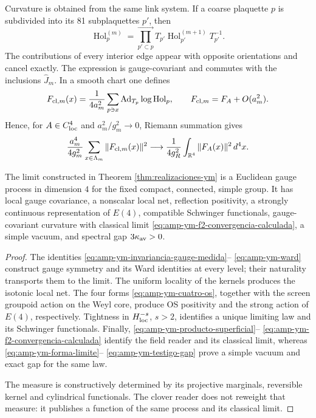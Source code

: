 Curvature is obtained from the same link system. If a coarse
plaquette \(p\) is subdivided into its 81 subplaquettes \(p'\), then
\begin{equation}\label{eq:amp-ym-producto-superficial}
 \operatorname{Hol}^{(m)}_{p}
 =\prod_{p'\subset p}^{\longrightarrow}
 T_{p'}\operatorname{Hol}^{(m+1)}_{p'}T_{p'}^{-1}.
\end{equation}
The contributions of every interior edge appear with opposite
orientations and cancel exactly.  The expression is gauge-covariant and
commutes with the inclusions \(\widehat J_m\).  In a smooth chart one defines
\begin{equation}\label{eq:amp-ym-clover-definido}
 F_{{\rm cl},m}(x)
 =\frac1{4a_m^2}\sum_{p\ni x}
 \operatorname{Ad}_{T_p}\log\operatorname{Hol}_{p},
 \qquad
 F_{{\rm cl},m}=F_A+O(a_m^2).
\end{equation}
Hence, for \(A\in C^4_{\rm loc}\) and
\(a_m^2/g_m^2\to0\), Riemann summation gives
\begin{equation}\label{eq:amp-ym-f2-convergencia-calculada}
 \frac{a_m^4}{4g_m^2}
 \sum_{x\in\Lambda_m}\|F_{{\rm cl},m}(x)\|^2
 \longrightarrow
 \frac1{4g_R^2}\int_{\mathbb R^4}\|F_A(x)\|^2\,d^4x.
\end{equation}

\begin{theorem}
\label{thm:amp-ym-identificacion-gauge}
The limit constructed in Theorem
\ref{thm:realizaciones-ym} is a Euclidean gauge process in dimension
\(4\) for the fixed compact, connected, simple group. It has
local gauge covariance, a nonscalar local net, reflection
positivity, a strongly continuous representation of \(E(4)\),
compatible Schwinger functionals, gauge-covariant curvature with classical
limit \eqref{eq:amp-ym-f2-convergencia-calculada}, a simple vacuum, and spectral
gap
\(3\kappa_{\rm av}>0\).
\end{theorem}

\begin{proof}
The identities \eqref{eq:amp-ym-invariancia-gauge-medida}--
\eqref{eq:amp-ym-ward} construct gauge symmetry and its Ward
identities at every level; their naturality transports them to the limit. The
uniform locality of the kernels produces the isotonic local net. The
four forms \eqref{eq:amp-ym-cuatro-os}, together with the screen
groupoid action on the Weyl core, produce OS positivity and the strong
action of \(E(4)\), respectively. Tightness in
\(H^{-s}_{\rm loc}\), \(s>2\), identifies a unique limiting law and its
Schwinger functionals. Finally,
\eqref{eq:amp-ym-producto-superficial}--
\eqref{eq:amp-ym-f2-convergencia-calculada} identify the field reader
and its classical limit, whereas
\eqref{eq:amp-ym-forma-limite}--
\eqref{eq:amp-ym-testigo-gap} prove a simple vacuum and exact gap for the
same law.

The measure is constructively determined by its projective
marginals, reversible kernel and cylindrical functionals. The clover
reader does not reweight that measure: it publishes a function of the same process and its
classical limit.
\end{proof}

